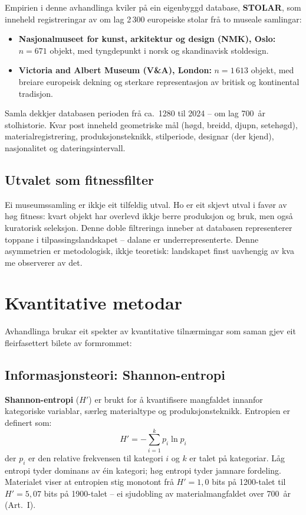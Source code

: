 \documentclass[12pt,a4paper,oneside]{report}
\begin{document}
Empirien i denne avhandlinga kviler på ein eigenbyggd database, \textbf{STOLAR}, som inneheld registreringar av om lag 2\,300 europeiske stolar frå to museale samlingar:

\begin{itemize}
  \item \textbf{Nasjonalmuseet for kunst, arkitektur og design (NMK), Oslo:} $n = 671$ objekt, med tyngdepunkt i norsk og skandinavisk stoldesign.
  \item \textbf{Victoria and Albert Museum (V\&A), London:} $n = 1\,613$ objekt, med breiare europeisk dekning og sterkare representasjon av britisk og kontinental tradisjon.
\end{itemize}

Samla dekkjer databasen perioden frå ca.\ 1280 til 2024 -- om lag 700~år stolhistorie. Kvar post inneheld geometriske mål (høgd, breidd, djupn, setehøgd), materialregistrering, produksjonsteknikk, stilperiode, designar (der kjend), nasjonalitet og dateringsintervall.

\subsection{Utvalet som fitnessfilter}

Ei museumssamling er ikkje eit tilfeldig utval. Ho er eit skjevt utval i favør av høg fitness: kvart objekt har overlevd ikkje berre produksjon og bruk, men også kuratorisk seleksjon. Denne doble filtreringa inneber at databasen representerer toppane i tilpassingslandskapet -- dalane er underrepresenterte. Denne asymmetrien er metodologisk, ikkje teoretisk: landskapet finst uavhengig av kva me observerer av det.

\section{Kvantitative metodar}

Avhandlinga brukar eit spekter av kvantitative tilnærmingar som saman gjev eit fleirfasettert bilete av formrommet:

\subsection{Informasjonsteori: Shannon-entropi}

\textbf{Shannon-entropi} ($H'$) er brukt for å kvantifisere mangfaldet innanfor kategoriske variablar, særleg materialtype og produksjonsteknikk. Entropien er definert som:
\begin{equation}
  H' = -\sum_{i=1}^{k} p_i \ln p_i
  \label{eq:shannon}
\end{equation}
der $p_i$ er den relative frekvensen til kategori $i$ og $k$ er talet på kategoriar. Låg entropi tyder dominans av éin kategori; høg entropi tyder jamnare fordeling. Materialet viser at entropien stig monotont frå $H' = 1{,}0$ bits på 1200-talet til $H' = 5{,}07$ bits på 1900-talet -- ei sjudobling av materialmangfaldet over 700~år (Art.~I).
\end{document}
